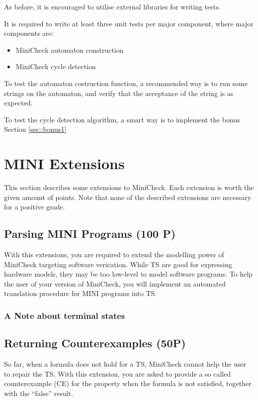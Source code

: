 \documentclass{article}
\begin{document}
As before, it is encouraged to utilise external libraries for writing tests.

It is required to write at least three unit tests per major component, where major components are:

\begin{itemize}
\item MiniCheck automaton construction
\item MiniCheck cycle detection
\end{itemize}

To test the automaton costruction function, a recommended way is to run some strings on the automaton, 
and verify that the acceptance of the string is as expected.

To test the cycle detection algorithm, a smart way is to implement the bonus Section \ref{sec::bonus1}

\section{MINI Extensions}
This section describes some extensions to MiniCheck. Each extension is worth the given amount of points. 
Note that none of the described extensions are necessary for a positive grade.

\subsection{Parsing MINI Programs (100 P)}
With this extensions, you are required to extend the modelling power of MiniCheck targeting 
software verication. While TS are good for expressing hardware models, they may be too low-level 
to model software programs. To help the user of your version of MiniCheck, you will implement an 
automated translation procedure for MINI programs into TS.

\subsubsection*{A Note about terminal states}

\subsection{Returning Counterexamples (50P)}
So far, when a formula does not hold for a TS, MiniCheck cannot help the user to repair the TS. With 
this extension, you are asked to provide a so called counterexample (CE) for the property when the formula is not 
satisfied, together with the ``false'' result.
\end{document}
